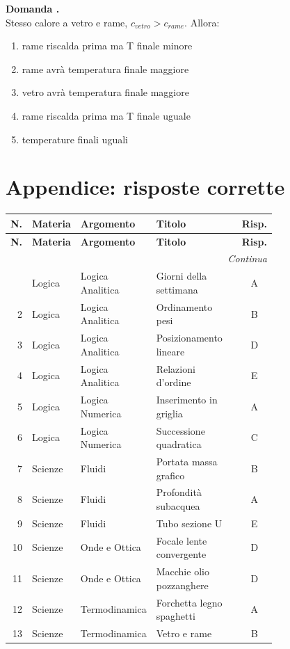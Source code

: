 \documentclass[12pt]{article}
\newcounter{quesito}
\newcommand{\nuovoquesito}{\stepcounter{quesito}\textbf{Domanda \arabic{quesito}.}}
\newcommand{\itemdomanda}[2]{%
    \par\noindent
    \begin{minipage}[t]{\linewidth}
        \nuovoquesito \\ #1
        \begin{enumerate}[label=(\Alph*), nosep, leftmargin=*]
            #2
        \end{enumerate}
    \end{minipage}
    \vspace{10pt}
}
\begin{document}
\itemdomanda{Stesso calore a vetro e rame, $c_{vetro} > c_{rame}$. Allora:}{
    \item rame riscalda prima ma T finale minore
    \item rame avrà temperatura finale maggiore
    \item vetro avrà temperatura finale maggiore
    \item rame riscalda prima ma T finale uguale
    \item temperature finali uguali
}

\newpage
\section*{Appendice: risposte corrette}
\begin{longtable}{@{}r>{\raggedright\arraybackslash}p{0.14\linewidth}>{\raggedright\arraybackslash}p{0.20\linewidth}>{\raggedright\arraybackslash}p{0.42\linewidth}c@{}}
\toprule
\textbf{N.} & \textbf{Materia} & \textbf{Argomento} & \textbf{Titolo} & \textbf{Risp.} \\
\midrule
\endfirsthead
\toprule
\textbf{N.} & \textbf{Materia} & \textbf{Argomento} & \textbf{Titolo} & \textbf{Risp.} \\
\midrule
\endhead
\midrule
\multicolumn{5}{r}{\footnotesize\textit{Continua}} \\
\endfoot
\bottomrule
\endlastfoot
1 & Logica & Logica Analitica & Giorni della settimana & A \\
2 & Logica & Logica Analitica & Ordinamento pesi & B \\
3 & Logica & Logica Analitica & Posizionamento lineare & D \\
4 & Logica & Logica Analitica & Relazioni d'ordine & E \\
5 & Logica & Logica Numerica & Inserimento in griglia & A \\
6 & Logica & Logica Numerica & Successione quadratica & C \\
7 & Scienze & Fluidi & Portata massa grafico & B \\
8 & Scienze & Fluidi & Profondità subacquea & A \\
9 & Scienze & Fluidi & Tubo sezione U & E \\
10 & Scienze & Onde e Ottica & Focale lente convergente & D \\
11 & Scienze & Onde e Ottica & Macchie olio pozzanghere & D \\
12 & Scienze & Termodinamica & Forchetta legno spaghetti & A \\
13 & Scienze & Termodinamica & Vetro e rame & B
\end{longtable}
\end{document}
